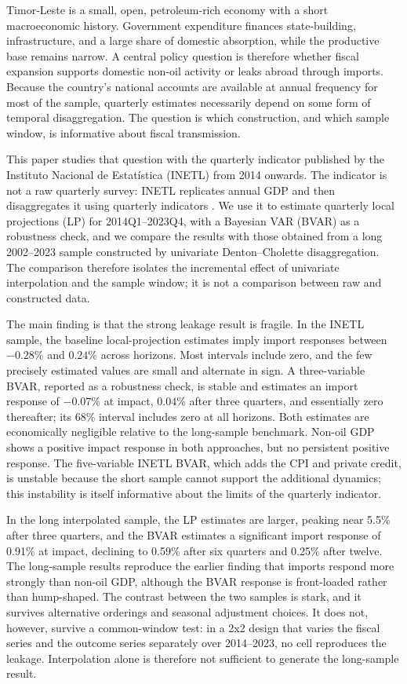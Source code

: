 \documentclass[11pt,a4paper]{article}
\begin{document}
Timor-Leste is a small, open, petroleum-rich economy with a short macroeconomic history. Government expenditure finances state-building, infrastructure, and a large share of domestic absorption, while the productive base remains narrow. A central policy question is therefore whether fiscal expansion supports domestic non-oil activity or leaks abroad through imports. Because the country's national accounts are available at annual frequency for most of the sample, quarterly estimates necessarily depend on some form of temporal disaggregation. The question is which construction, and which sample window, is informative about fiscal transmission.

This paper studies that question with the quarterly indicator published by the Instituto Nacional de Estatística (INETL) from 2014 onwards. The indicator is not a raw quarterly survey: INETL replicates annual GDP and then disaggregates it using quarterly indicators \parencite{inetl2023}. We use it to estimate quarterly local projections (LP) for 2014Q1--2023Q4, with a Bayesian VAR (BVAR) as a robustness check, and we compare the results with those obtained from a long 2002--2023 sample constructed by univariate Denton--Cholette disaggregation. The comparison therefore isolates the incremental effect of univariate interpolation and the sample window; it is not a comparison between raw and constructed data.

The main finding is that the strong leakage result is fragile. In the INETL sample, the baseline local-projection estimates imply import responses between $-0.28\%$ and $0.24\%$ across horizons. Most intervals include zero, and the few precisely estimated values are small and alternate in sign. A three-variable BVAR, reported as a robustness check, is stable and estimates an import response of $-0.07\%$ at impact, $0.04\%$ after three quarters, and essentially zero thereafter; its 68\% interval includes zero at all horizons. Both estimates are economically negligible relative to the long-sample benchmark. Non-oil GDP shows a positive impact response in both approaches, but no persistent positive response. The five-variable INETL BVAR, which adds the CPI and private credit, is unstable because the short sample cannot support the additional dynamics; this instability is itself informative about the limits of the quarterly indicator.

In the long interpolated sample, the LP estimates are larger, peaking near 5.5\% after three quarters, and the BVAR estimates a significant import response of 0.91\% at impact, declining to 0.59\% after six quarters and 0.25\% after twelve. The long-sample results reproduce the earlier finding that imports respond more strongly than non-oil GDP, although the BVAR response is front-loaded rather than hump-shaped. The contrast between the two samples is stark, and it survives alternative orderings and seasonal adjustment choices. It does not, however, survive a common-window test: in a 2x2 design that varies the fiscal series and the outcome series separately over 2014--2023, no cell reproduces the leakage. Interpolation alone is therefore not sufficient to generate the long-sample result.
\end{document}
